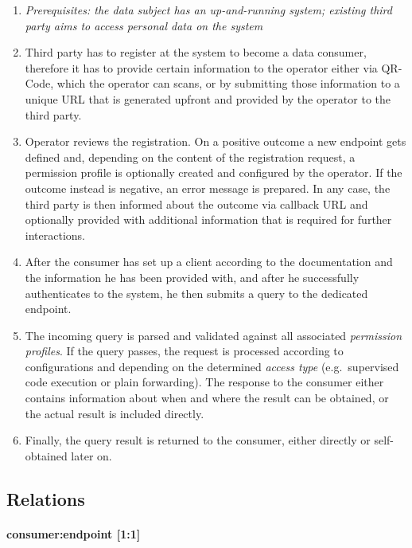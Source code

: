 \documentclass[12pt,english,a4paper,titlepage,cleardoublepage=empty,dottedtoc]{report}
\begin{document}
\begin{enumerate}
\def\labelenumi{\arabic{enumi}.}
\setcounter{enumi}{-1}
\item
  \emph{Prerequisites: the data subject has an up-and-running system;
  existing third party aims to access personal data on the system}
\item
  Third party has to register at the system to become a data consumer,
  therefore it has to provide certain information to the operator either
  via QR-Code, which the operator can scans, or by submitting those
  information to a unique URL that is generated upfront and provided by
  the operator to the third party.
\item
  Operator reviews the registration. On a positive outcome a new
  endpoint gets defined and, depending on the content of the
  registration request, a permission profile is optionally created and
  configured by the operator. If the outcome instead is negative, an
  error message is prepared. In any case, the third party is then
  informed about the outcome via callback URL and optionally provided
  with additional information that is required for further interactions.
\item
  After the consumer has set up a client according to the documentation
  and the information he has been provided with, and after he
  successfully authenticates to the system, he then submits a query to
  the dedicated endpoint.
\item
  The incoming query is parsed and validated against all associated
  \emph{permission profiles}. If the query passes, the request is
  processed according to configurations and depending on the determined
  \emph{access type} (e.g.~supervised code execution or plain
  forwarding). The response to the consumer either contains information
  about when and where the result can be obtained, or the actual result
  is included directly.
\item
  Finally, the query result is returned to the consumer, either directly
  or self-obtained later on.
\end{enumerate}

\newpage

\subsection{Relations}\label{relations}

\paragraph{consumer:endpoint {[}1:1{]}}\label{consumerendpoint-11}
\end{document}

